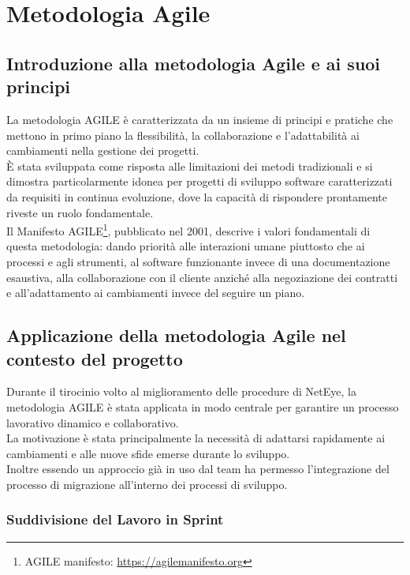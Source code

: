 \chapter{Metodologia Agile\cite{beck2001agile}}
\label{cha:agile}

\section{Introduzione alla metodologia Agile e ai suoi principi}
\label{sec:introduzione_agile}

La metodologia AGILE è caratterizzata da un insieme di principi e pratiche che mettono
in primo piano la flessibilità, la collaborazione e l'adattabilità ai
cambiamenti nella gestione dei progetti.\\ È stata sviluppata come risposta alle
limitazioni dei metodi tradizionali e si dimostra particolarmente idonea per
progetti di sviluppo software caratterizzati da requisiti in continua evoluzione,
dove la capacità di rispondere prontamente riveste un ruolo fondamentale.\\ Il Manifesto
AGILE\footnote{AGILE manifesto: \url{https://agilemanifesto.org}}, pubblicato nel
2001, descrive i valori fondamentali di questa metodologia: dando priorità alle interazioni
umane piuttosto che ai processi e agli strumenti, al software funzionante invece
di una documentazione esaustiva, alla collaborazione con il cliente anziché alla
negoziazione dei contratti e all'adattamento ai cambiamenti invece del seguire un
piano.

\section{Applicazione della metodologia Agile nel contesto del progetto}
\label{sec:applicazione_agile}

Durante il tirocinio volto al miglioramento delle procedure di NetEye, la metodologia
AGILE è stata applicata in modo centrale per garantire un processo lavorativo dinamico
e collaborativo.\\ La motivazione è stata principalmente la necessità di adattarsi
rapidamente ai cambiamenti e alle nuove sfide emerse durante lo sviluppo.\\ Inoltre
essendo un approccio già in uso dal team ha permesso l'integrazione del processo
di migrazione all'interno dei processi di sviluppo.

\subsection{Suddivisione del Lavoro in Sprint}
\label{sub:sprint}

